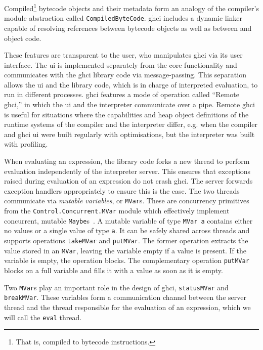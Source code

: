 \documentclass[thesis=B,english]{FITthesis}[2019/12/23]
\newcommand{\hsType}[1]{\texttt{#1}}
\newcommand{\hsIdent}[1]{\texttt{#1}}
\newcommand{\hsModule}[1]{\texttt{#1}}
\begin{document}
Compiled\footnote{That is, compiled to bytecode instructions.} bytecode objects
and their metadata form an analogy of the compiler's module abstraction called
\hsType{CompiledByteCode}. \acrshort{ghci} includes a dynamic linker capable of
resolving references between bytecode objects as well as between
 and object code.

These features are transparent to the user, who manipulates \acrshort{ghci} via
its user interface. The \acrshort{ui} is implemented separately from the core
functionality and communicates with the \acrshort{ghci} library code via
message-passing. This separation allows the \acrshort{ui} and the library code,
which is in charge of interpreted evaluation, to run in different processes.
\acrshort{ghci} features a mode of operation called ``Remote \acrshort{ghci},''
in which the \acrshort{ui} and the interpreter communicate over a pipe. Remote
\acrshort{ghci} is useful for situations where the capabilities and heap object
definitions of the runtime systems of the compiler and the interpreter differ,
e.g. when the compiler and \acrshort{ghci} \acrshort{ui} were built regularly
with optimisations, but the interpreter was built with profiling.

When evaluating an expression, the library code forks a new thread to perform
evaluation independently of the interpreter server. This ensures that
exceptions raised during evaluation of an expression do not crash
\acrshort{ghci}. The server forwards exception handlers appropriately to ensure
this is the case. The two threads communicate via \textit{mutable variables},
or \hsType{MVar}s. These are concurrency primitives from the
\hsModule{Control.Concurrent.MVar} module which effectively implement
concurrent, mutable \hsType{Maybe}s~\cite{concurrent-haskell}. A mutable
variable of type \hsType{MVar a} contains either no values or a single value of
type \hsType{a}. It can be safely shared across threads and supports
operations \hsIdent{takeMVar} and \hsIdent{putMVar}. The former operation
extracts the value stored in an \hsType{MVar}, leaving the variable empty if a
value is present. If the variable is empty, the operation blocks. The
complementary operation \hsIdent{putMVar} blocks on a full variable and fills
it with a value as soon as it is empty.

Two \hsType{MVar}s play an important role in the design of \acrshort{ghci},
\hsIdent{statusMVar} and \hsIdent{breakMVar}. These variables form a
communication channel between the server thread and the thread responsible for
the evaluation of an expression, which we will call the \texttt{eval} thread.
\end{document}
